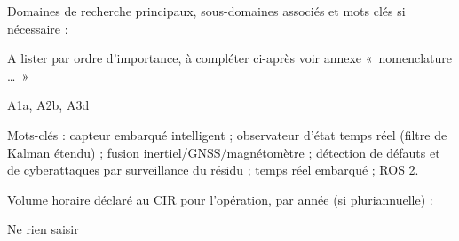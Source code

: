 Domaines de recherche principaux, sous-domaines associés et mots clés si nécessaire : \par A lister par ordre d’importance, à compléter ci-après  voir annexe «~nomenclature …~»

A1a, A2b, A3d

Mots-clés : capteur embarqué intelligent ; observateur d'état temps réel (filtre de Kalman étendu) ; fusion inertiel/GNSS/magnétomètre ; détection de défauts et de cyberattaques par surveillance du résidu ; temps réel embarqué ; ROS 2.

Volume horaire déclaré au CIR pour l’opération, par année (si pluriannuelle) : 

Ne rien saisir
